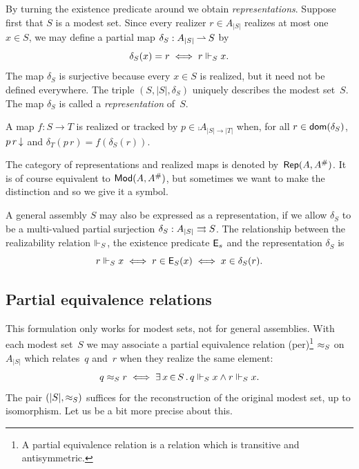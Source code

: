 By turning the existence predicate around we obtain
\emph{representations}. Suppose first that $S$ is a modest set. Since
every realizer $r \in A_{|S|}$ realizes at most one $x \in S$, we may
define a partial map $\delta_S : A_{|S|} \mathbin{\rightharpoonup} S$ by
%
\begin{equation*}
  \delta_S(x) = r \iff r \Vdash_S x.
\end{equation*}
%
The map $\delta_S$ is surjective because every $x \in S$ is realized,
but it need not be defined everywhere. The triple $(S, |S|, \delta_S)$
uniquely describes the modest set~$S$. The map $\delta_S$ is called a
\emph{representation} of~$S$.

A map $f : S \to T$ is realized or tracked by $p \in \comp{A}_{|S| \to
  |T|}$ when, for all $r \in \mathsf{dom}(\delta_S)$, $p\,r\,{\downarrow}$ and
$\delta_T(p\,r) = f(\delta_S(r))$.

The category of representations and realized maps is denoted
by~$\mathsf{Rep}(A,A^{\#})$. It is of course equivalent to $\mathsf{Mod}(A,
  A^{\#})$, but sometimes we want to make the distinction and so we
give it a symbol.

A general assembly $S$ may also be expressed as a representation, if
we allow $\delta_S$ to be a multi-valued partial surjection $\delta_S
: A_{|S|} \rightrightarrows S$. The relationship between the realizability
relation $\Vdash_S$, the existence predicate $\mathsf{E}_s$ and the
representation $\delta_S$ is
%
\begin{equation*}
  r \Vdash_S x \iff
  r \in \mathsf{E}_S(x) \iff
  x \in \delta_S(r).
\end{equation*}


\subsection{Partial equivalence relations}
\label{sec:pers}

This formulation only works for modest sets, not for general
assemblies. With each modest set~$S$ we may associate a partial
equivalence relation (per)\footnote{A partial equivalence relation is
  a relation which is transitive and antisymmetric.} $\approx_S$ on
$A_{|S|}$ which relates~$q$ and~$r$ when they realize the same
element:
%
\begin{equation*}
  q \approx_S r \iff
  \exists\, x \,{\in}\, S\,.\,q \Vdash_S x \land r \Vdash_S x.
\end{equation*}
%
The pair $(|S|, {\approx_S})$ suffices for the reconstruction of the
original modest set, up to isomorphism. Let us be a bit more precise
about this.

